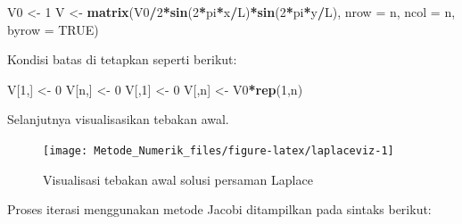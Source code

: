 \documentclass[
]{book}
\newenvironment{Shaded}{\begin{snugshade}}{\end{snugshade}}
\newcommand{\AttributeTok}[1]{\textcolor[rgb]{0.13,0.29,0.53}{#1}}
\newcommand{\ConstantTok}[1]{\textcolor[rgb]{0.56,0.35,0.01}{#1}}
\newcommand{\DecValTok}[1]{\textcolor[rgb]{0.00,0.00,0.81}{#1}}
\newcommand{\FunctionTok}[1]{\textcolor[rgb]{0.13,0.29,0.53}{\textbf{#1}}}
\newcommand{\NormalTok}[1]{#1}
\newcommand{\OtherTok}[1]{\textcolor[rgb]{0.56,0.35,0.01}{#1}}
\newcommand{\SpecialCharTok}[1]{\textcolor[rgb]{0.81,0.36,0.00}{\textbf{#1}}}
\theoremstyle{definition}
\theoremstyle{definition}
\theoremstyle{definition}
\theoremstyle{definition}
\theoremstyle{remark}
\begin{document}
\begin{Shaded}
\begin{Highlighting}[]
\NormalTok{V0  }\OtherTok{\textless{}{-}} \DecValTok{1}
\NormalTok{V   }\OtherTok{\textless{}{-}} \FunctionTok{matrix}\NormalTok{(V0}\SpecialCharTok{/}\DecValTok{2}\SpecialCharTok{*}\FunctionTok{sin}\NormalTok{(}\DecValTok{2}\SpecialCharTok{*}\NormalTok{pi}\SpecialCharTok{*}\NormalTok{x}\SpecialCharTok{/}\NormalTok{L)}\SpecialCharTok{*}\FunctionTok{sin}\NormalTok{(}\DecValTok{2}\SpecialCharTok{*}\NormalTok{pi}\SpecialCharTok{*}\NormalTok{y}\SpecialCharTok{/}\NormalTok{L),}
              \AttributeTok{nrow =}\NormalTok{ n, }\AttributeTok{ncol =}\NormalTok{ n, }\AttributeTok{byrow =} \ConstantTok{TRUE}\NormalTok{)}
\end{Highlighting}
\end{Shaded}

Kondisi batas di tetapkan seperti berikut:

\begin{Shaded}
\begin{Highlighting}[]
\NormalTok{V[}\DecValTok{1}\NormalTok{,] }\OtherTok{\textless{}{-}} \DecValTok{0}
\NormalTok{V[n,] }\OtherTok{\textless{}{-}} \DecValTok{0}
\NormalTok{V[,}\DecValTok{1}\NormalTok{] }\OtherTok{\textless{}{-}} \DecValTok{0}
\NormalTok{V[,n] }\OtherTok{\textless{}{-}}\NormalTok{ V0}\SpecialCharTok{*}\FunctionTok{rep}\NormalTok{(}\DecValTok{1}\NormalTok{,n)}
\end{Highlighting}
\end{Shaded}

Selanjutnya visualisasikan tebakan awal.

\begin{figure}

{\centering \texttt{[image: Metode\_Numerik\_files/figure-latex/laplaceviz-1]} 

}

\caption{Visualisasi tebakan awal solusi persaman Laplace}\label{fig:laplaceviz}
\end{figure}

Proses iterasi menggunakan metode Jacobi ditampilkan pada sintaks berikut:
\end{document}
